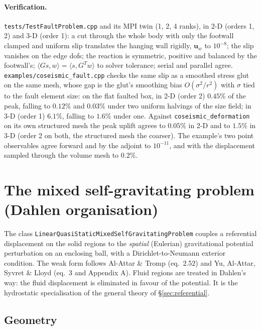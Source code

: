 \documentclass[11pt]{article}
\numberwithin{equation}{section}
\theoremstyle{remark}
\newcommand{\vu}{\mathbf{u}}
\newcommand{\code}[1]{\texttt{#1}}
\begin{document}
\paragraph{Verification.} \code{tests/TestFaultProblem.cpp} and its MPI
twin (1, 2, 4 ranks), in 2-D (orders 1, 2) and 3-D (order 1): a cut
through the whole body with only the footwall clamped and uniform slip
translates the hanging wall rigidly, $\vu_w$ to $10^{-8}$; the slip
vanishes on the edge dofs; the reaction is symmetric, positive and
balanced by the footwall's; $\langle Gs, w\rangle = \langle s,
G^Tw\rangle$ to solver tolerance; serial and parallel agree.
\code{examples/coseismic\_fault.cpp} checks the same slip as a smoothed
stress glut on the same mesh, whose gap is the glut's smoothing bias
$O(\sigma^2/r^2)$ with $\sigma$ tied to the fault element size: on the
flat faulted box, in 2-D (order 2) $0.45\%$ of the peak, falling to $0.12\%$ and $0.03\%$ under
two uniform halvings of the size field; in 3-D (order 1) $6.1\%$, falling
to $1.6\%$ under one. Against \code{coseismic\_deformation} on its own
structured mesh the peak uplift agrees to $0.05\%$ in 2-D and to $1.5\%$
in 3-D (order 2 on both, the structured mesh the coarser). The example's
two point observables agree forward and by the adjoint to $10^{-11}$, and
with the displacement sampled through the volume mesh to $0.2\%$.

\section{The mixed self-gravitating problem (Dahlen organisation)}
\label{sec:mixed}

The class \code{LinearQuasiStaticMixedSelfGravitatingProblem} couples a
referential displacement on the solid regions to the \emph{spatial}
(Eulerian) gravitational potential perturbation on an enclosing ball, with
a Dirichlet-to-Neumann exterior condition. The weak form follows Al-Attar
\& Tromp \cite{AlAttarTromp2014} (eq.~2.52) and Yu, Al-Attar, Syvret \&
Lloyd \cite{Yu2025} (eq.~3 and Appendix A). Fluid regions are treated in
Dahlen's way: the fluid displacement is eliminated in favour of the
potential. It is the hydrostatic specialisation of the general theory of
\S\ref{sec:referential}.

\subsection{Geometry}
\end{document}
